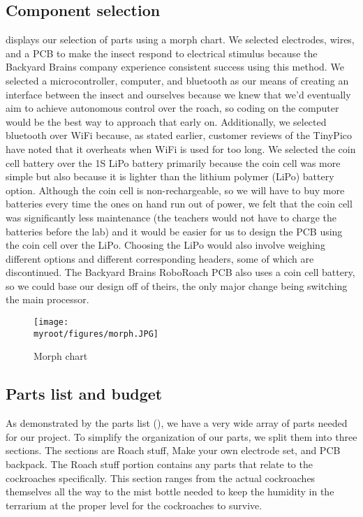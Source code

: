 \documentclass[twocolumn,10pt]{IEEEtran}
\newcommand{\myroot}{.}
\begin{document}
\subsection{Component selection}
 displays our selection of parts using a morph chart. We selected electrodes, wires, and a PCB to make the insect respond to electrical stimulus because the Backyard Brains company experience consistent success using this method. We selected a microcontroller, computer, and bluetooth as our means of creating an interface between the insect and ourselves because we knew that we'd eventually aim to achieve autonomous control over the roach, so coding on the computer would be the best way to approach that early on. Additionally, we selected bluetooth over WiFi because, as stated earlier, customer reviews of the TinyPico have noted that it overheats when WiFi is used for too long. We selected the coin cell battery over the 1S LiPo battery primarily because the coin cell was more simple but also because it is lighter than the lithium polymer (LiPo) battery option. Although the coin cell is non-rechargeable, so we will have to buy more batteries every time the ones on hand run out of power, we felt that the coin cell was significantly less maintenance (the teachers would not have to charge the batteries before the lab) and it would be easier for us to design the PCB using the coin cell over the LiPo. Choosing the LiPo would also involve weighing different options and different corresponding headers, some of which are discontinued. The Backyard Brains RoboRoach PCB also uses a coin cell battery, so we could base our design off of theirs, the only major change being switching the main processor.
\begin{figure}[ht!]
\centering
\texttt{[image: \\myroot/figures/morph.JPG]}
\caption{Morph chart}
\label{fig:morph}
\end{figure}

\subsection{Parts list and budget}
As demonstrated by the parts list (), we have a very wide array of parts needed for our project. To simplify the organization of our parts, we split them into three sections. The sections are Roach stuff, Make your own electrode set, and PCB backpack. The Roach stuff portion contains any parts that relate to the cockroaches specifically. This section ranges from the actual cockroaches themselves all the way to the mist bottle needed to keep the humidity in the terrarium at the proper level for the cockroaches to survive.
\end{document}
